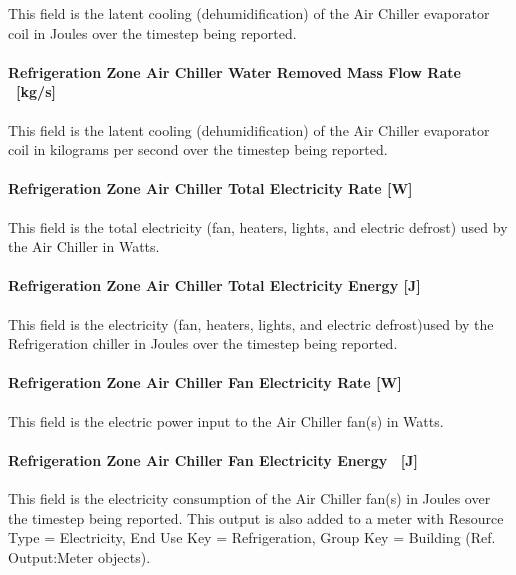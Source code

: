 This field is the latent cooling (dehumidification) of the Air Chiller evaporator coil in Joules over the timestep being reported.

\paragraph{Refrigeration Zone Air Chiller Water Removed Mass Flow Rate ~{[}kg/s{]}}\label{refrigeration-zone-air-chiller-water-removed-mass-flow-rate-kgs-1}

This field is the latent cooling (dehumidification) of the Air Chiller evaporator coil in kilograms per second over the timestep being reported.

\paragraph{Refrigeration Zone Air Chiller Total Electricity Rate {[}W{]}}\label{refrigeration-zone-air-chiller-total-electric-power-w}

This field is the total electricity (fan, heaters, lights, and electric defrost) used by the Air Chiller in Watts.

\paragraph{Refrigeration Zone Air Chiller Total Electricity Energy {[}J{]}}\label{refrigeration-zone-air-chiller-total-electric-energy-j}

This field is the electricity (fan, heaters, lights, and electric defrost)used by the Refrigeration chiller in Joules over the timestep being reported.

\paragraph{Refrigeration Zone Air Chiller Fan Electricity Rate {[}W{]}}\label{refrigeration-zone-air-chiller-fan-electric-power-w}

This field is the electric power input to the Air Chiller fan(s) in Watts.

\paragraph{Refrigeration Zone Air Chiller Fan Electricity Energy ~{[}J{]}}\label{refrigeration-zone-air-chiller-fan-electric-energy-j}

This field is the electricity consumption of the Air Chiller fan(s) in Joules over the timestep being reported. This output is also added to a meter with Resource Type = Electricity, End Use Key = Refrigeration, Group Key = Building (Ref. Output:Meter objects).

